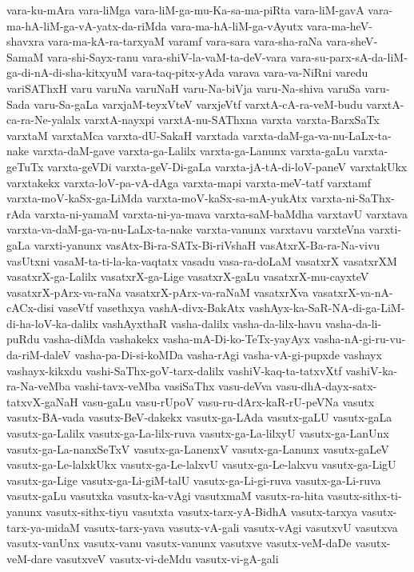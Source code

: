 {vara-ku-mAra
vara-liMga
vara-liM-ga-mu-Ka-sa-ma-piRta
vara-liM-gavA
vara-ma-hA-liM-ga-vA-yatx-da-riMda
vara-ma-hA-liM-ga-vAyutx
vara-ma-heV-shavxra
vara-ma-kA-ra-tarxyaM
varamf
vara-sara
vara-sha-raNa
vara-sheV-SamaM
vara-shi-Sayx-ranu
vara-shiV-la-vaM-ta-deV-vara
vara-su-parx-sA-da-liM-ga-di-nA-di-sha-kitxyuM
vara-taq-pitx-yAda
varava
vara-va-NiRni
varedu
variSAThxH
varu
varuNa
varuNaH
varu-Na-biVja
varu-Na-shiva
varuSa
varu-Sada
varu-Sa-gaLa
varxjaM-teyxVteV
varxjeVtf
varxtA-cA-ra-veM-budu
varxtA-ca-ra-Ne-yalalx
varxtA-nayxpi
varxtA-nu-SAThxna
varxta
varxta-BarxSaTx
varxtaM
varxtaMca
varxta-dU-SakaH
varxtada
varxta-daM-ga-va-nu-LaLx-ta-nake
varxta-daM-gave
varxta-ga-Lalilx
varxta-ga-Lanunx
varxta-gaLu
varxta-geTuTx
varxta-geVDi
varxta-geV-Di-gaLa
varxta-jA-tA-di-loV-paneV
varxtakUkx
varxtakekx
varxta-loV-pa-vA-dAga
varxta-mapi
varxta-meV-tatf
varxtamf
varxta-moV-kaSx-ga-LiMda
varxta-moV-kaSx-sa-mA-yukAtx
varxta-ni-SaThx-rAda
varxta-ni-yamaM
varxta-ni-ya-mava
varxta-saM-baMdha
varxtavU
varxtava
varxta-va-daM-ga-va-nu-LaLx-ta-nake
varxta-vanunx
varxtavu
varxteVna
varxti-gaLa
varxti-yanunx
vasAtx-Bi-ra-SATx-Bi-riVshaH
vasAtxrX-Ba-ra-Na-vivu
vasUtxni
vasaM-ta-ti-la-ka-vaqtatx
vasadu
vasa-ra-doLaM
vasatxrX
vasatxrXM
vasatxrX-ga-Lalilx
vasatxrX-ga-Lige
vasatxrX-gaLu
vasatxrX-mu-cayxteV
vasatxrX-pArx-va-raNa
vasatxrX-pArx-va-raNaM
vasatxrXva
vasatxrX-va-nA-cACx-disi
vaseVtf
vasethxya
vashA-divx-BakAtx
vashAyx-ka-SaR-NA-di-ga-LiM-di-ha-loV-ka-dalilx
vashAyxthaR
vasha-dalilx
vasha-da-lilx-havu
vasha-da-li-puRdu
vasha-diMda
vashakekx
vasha-mA-Di-ko-TeTx-yayAyx
vasha-nA-gi-ru-vu-da-riM-daleV
vasha-pa-Di-si-koMDa
vasha-rAgi
vasha-vA-gi-pupxde
vashayx
vashayx-kikxdu
vashi-SaThx-goV-tarx-dalilx
vashiV-kaq-ta-tatxvXtf
vashiV-ka-ra-Na-veMba
vashi-tavx-veMba
vasiSaThx
vasu-deVva
vasu-dhA-dayx-satx-tatxvX-gaNaH
vasu-gaLu
vasu-rUpoV
vasu-ru-dArx-kaR-rU-peVNa
vasutx
vasutx-BA-vada
vasutx-BeV-dakekx
vasutx-ga-LAda
vasutx-gaLU
vasutx-gaLa
vasutx-ga-Lalilx
vasutx-ga-La-lilx-ruva
vasutx-ga-La-lilxyU
vasutx-ga-LanUnx
vasutx-ga-La-nanxSeTxV
vasutx-ga-LanenxV
vasutx-ga-Lanunx
vasutx-gaLeV
vasutx-ga-Le-lalxkUkx
vasutx-ga-Le-lalxvU
vasutx-ga-Le-lalxvu
vasutx-ga-LigU
vasutx-ga-Lige
vasutx-ga-Li-giM-talU
vasutx-ga-Li-gi-ruva
vasutx-ga-Li-ruva
vasutx-gaLu
vasutxka
vasutx-ka-vAgi
vasutxmaM
vasutx-ra-hita
vasutx-sithx-ti-yanunx
vasutx-sithx-tiyu
vasutxta
vasutx-tarx-yA-BidhA
vasutx-tarxya
vasutx-tarx-ya-midaM
vasutx-tarx-yava
vasutx-vA-gali
vasutx-vAgi
vasutxvU
vasutxva
vasutx-vanUnx
vasutx-vanu
vasutx-vanunx
vasutxve
vasutx-veM-daDe
vasutx-veM-dare
vasutxveV
vasutx-vi-deMdu
vasutx-vi-gA-gali
}
